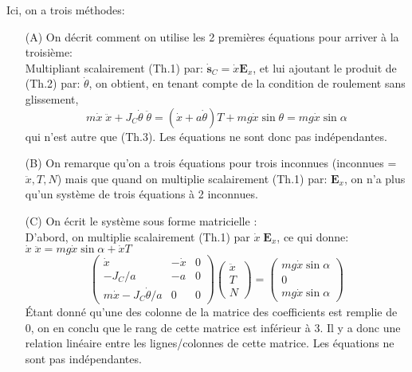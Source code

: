 \documentclass[a4paper]{article}
\begin{document}
Ici, on a trois méthodes: 
\begin{enumerate}

\item[(A)] On décrit comment on utilise les 2 premières équations pour arriver à la troisième: \\
Multipliant scalairement (Th.1) par: $ \dot{\textbf{s}}_C = \dot{x} \textbf{E}_x $, et lui ajoutant le produit de (Th.2) par: $ \dot{\theta} $, on obtient, en tenant compte de la condition de roulement sans glissement,
\[ m \dot{x} \; \ddot{x} + J_C \dot{\theta} \; \ddot{\theta} = (\dot{x} + a \dot{\theta}) T + m g \dot{x} \sin \theta = m g \dot{x} \sin \alpha \]
qui n’est autre que (Th.3). Les équations ne sont donc pas indépendantes.

\item[(B)] On remarque qu'on a trois équations pour trois inconnues (inconnues = $ \ddot{x}, T, N $) mais que quand on multiplie scalairement (Th.1) par: $ \textbf{E}_x $, on n'a plus qu'un système de trois équations à 2 inconnues.

\item[(C)] On écrit le système sous forme matricielle : \\
D'abord, on multiplie scalairement (Th.1) par $ \dot{x} \; \textbf{E}_x $, ce qui donne: $ \dot{x} \; \ddot{x} = m g \dot{x} \sin \alpha + \dot{x} T $
\[
\begin{pmatrix}
\dot{x} & - \dot{x} & 0 \\
-J_C/a & -a & 0 \\
m \dot{x} - J_C \dot{\theta}/a & 0 & 0
\end{pmatrix}
\begin{pmatrix}
\ddot{x} \\
T \\
N
\end{pmatrix}
=
\begin{pmatrix}
m g \dot{x} \sin \alpha \\
0 \\
m g \dot{x} \sin \alpha
\end{pmatrix}
\]
Étant donné qu'une des colonne de la matrice des coefficients est remplie de 0, on en conclu que le rang de cette matrice est inférieur à 3. Il y a donc une relation linéaire entre les lignes/colonnes de cette matrice. Les équations ne sont pas indépendantes.

\end{enumerate}
\end{document}
